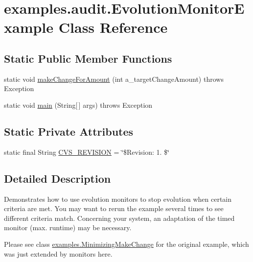 \hypertarget{classexamples_1_1audit_1_1_evolution_monitor_example}{\section{examples.\-audit.\-Evolution\-Monitor\-Example Class Reference}
\label{classexamples_1_1audit_1_1_evolution_monitor_example}
}
\subsection*{Static Public Member Functions}
\begin{DoxyCompactItemize}
\item 
static void \hyperlink{classexamples_1_1audit_1_1_evolution_monitor_example_a6cf968c3312a6486ea7b1aab0f0f3df5}{make\-Change\-For\-Amount} (int a\-\_\-target\-Change\-Amount)  throws Exception 
\item 
static void \hyperlink{classexamples_1_1audit_1_1_evolution_monitor_example_a421cc176918c3a7b00e3d5782b4b6e87}{main} (String\mbox{[}$\,$\mbox{]} args)  throws Exception 
\end{DoxyCompactItemize}
\subsection*{Static Private Attributes}
\begin{DoxyCompactItemize}
\item 
static final String \hyperlink{classexamples_1_1audit_1_1_evolution_monitor_example_ac4ed804deb85daa80d3952f41a83ab42}{C\-V\-S\-\_\-\-R\-E\-V\-I\-S\-I\-O\-N} = \char`\"{}\$Revision\-: 1. \$\char`\"{}
\end{DoxyCompactItemize}


\subsection{Detailed Description}
Demonstrates how to use evolution monitors to stop evolution when certain criteria are met. You may want to rerun the example several times to see different criteria match. Concerning your system, an adaptation of the timed monitor (max. runtime) may be necessary. 

Please see class \hyperlink{classexamples_1_1_minimizing_make_change}{examples.\-Minimizing\-Make\-Change} for the original example, which was just extended by monitors here.

